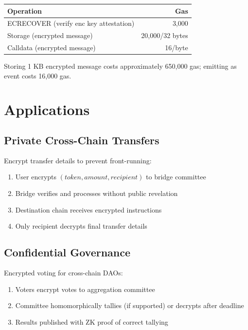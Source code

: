 \documentclass[11pt,a4paper]{article}
\begin{document}
\begin{center}
\begin{tabular}{|l|r|}
\hline
\textbf{Operation} & \textbf{Gas} \\
\hline
ECRECOVER (verify enc key attestation) & 3,000 \\
Storage (encrypted message) & 20,000/32 bytes \\
Calldata (encrypted message) & 16/byte \\
\hline
\end{tabular}
\end{center}

Storing 1 KB encrypted message costs approximately 650,000 gas; emitting as event costs 16,000 gas.

\section{Applications}

\subsection{Private Cross-Chain Transfers}

Encrypt transfer details to prevent front-running:
\begin{enumerate}
    \item User encrypts $(token, amount, recipient)$ to bridge committee
    \item Bridge verifies and processes without public revelation
    \item Destination chain receives encrypted instructions
    \item Only recipient decrypts final transfer details
\end{enumerate}

\subsection{Confidential Governance}

Encrypted voting for cross-chain DAOs:
\begin{enumerate}
    \item Voters encrypt votes to aggregation committee
    \item Committee homomorphically tallies (if supported) or decrypts after deadline
    \item Results published with ZK proof of correct tallying
\end{enumerate}
\end{document}

